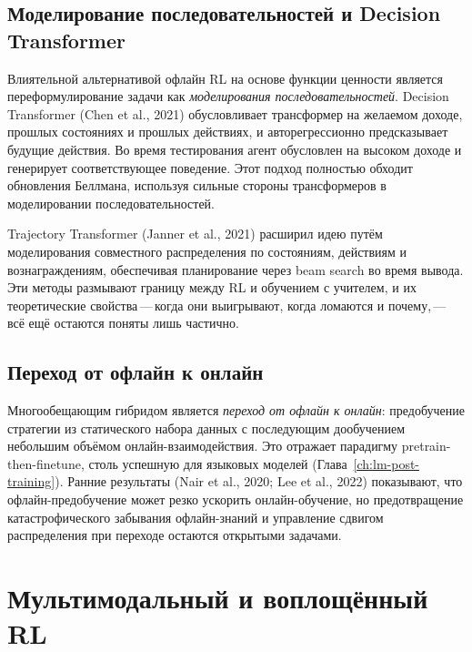 \subsection{Моделирование последовательностей и Decision Transformer}

Влиятельной альтернативой офлайн RL на основе функции ценности является
переформулирование задачи как \emph{моделирования последовательностей}. Decision
Transformer (Chen et al., 2021) обусловливает трансформер на желаемом
доходе, прошлых состояниях и прошлых действиях, и авторегрессионно
предсказывает будущие действия. Во время тестирования агент обусловлен на
высоком доходе и генерирует соответствующее поведение. Этот подход
полностью обходит обновления Беллмана, используя сильные стороны трансформеров
в моделировании последовательностей.

Trajectory Transformer (Janner et al., 2021) расширил идею путём
моделирования совместного распределения по состояниям, действиям и вознаграждениям,
обеспечивая планирование через beam search во время вывода. Эти методы размывают
границу между RL и обучением с учителем, и их теоретические
свойства\,---\,когда они выигрывают, когда ломаются и почему,\,---\,
всё ещё остаются поняты лишь частично.

\subsection{Переход от офлайн к онлайн}

Многообещающим гибридом является \emph{переход от офлайн к онлайн}: предобучение стратегии
из статического набора данных с последующим дообучением небольшим объёмом
онлайн-взаимодействия. Это отражает парадигму pretrain-then-finetune, столь
успешную для языковых моделей
(Глава~\ref{ch:lm-post-training}). Ранние результаты (Nair et al.,
2020; Lee et al., 2022) показывают, что офлайн-предобучение может
резко ускорить онлайн-обучение, но предотвращение катастрофического
забывания офлайн-знаний и управление сдвигом распределения
при переходе остаются открытыми задачами.


\section{Мультимодальный и воплощённый RL}
\label{sec:open-embodied}

